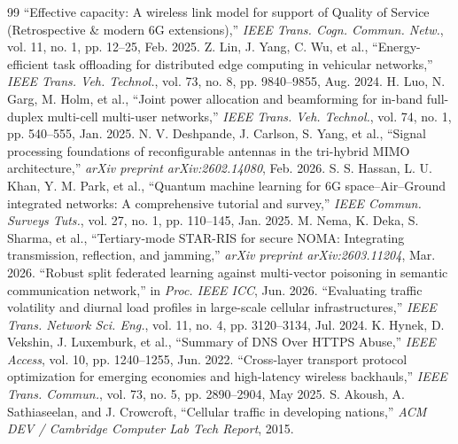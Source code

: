 \documentclass[journal]{IEEEtran}
\begin{document}
\begin{thebibliography}{99}
 ``Effective capacity: A wireless link model for support of Quality of Service (Retrospective \& modern 6G extensions),'' \emph{IEEE Trans. Cogn. Commun. Netw.}, vol. 11, no. 1, pp. 12--25, Feb. 2025.
 Z. Lin, J. Yang, C. Wu, et al., ``Energy-efficient task offloading for distributed edge computing in vehicular networks,'' \emph{IEEE Trans. Veh. Technol.}, vol. 73, no. 8, pp. 9840--9855, Aug. 2024.
 H. Luo, N. Garg, M. Holm, et al., ``Joint power allocation and beamforming for in-band full-duplex multi-cell multi-user networks,'' \emph{IEEE Trans. Veh. Technol.}, vol. 74, no. 1, pp. 540--555, Jan. 2025.
 N. V. Deshpande, J. Carlson, S. Yang, et al., ``Signal processing foundations of reconfigurable antennas in the tri-hybrid MIMO architecture,'' \emph{arXiv preprint arXiv:2602.14080}, Feb. 2026.
 S. S. Hassan, L. U. Khan, Y. M. Park, et al., ``Quantum machine learning for 6G space–Air–Ground integrated networks: A comprehensive tutorial and survey,'' \emph{IEEE Commun. Surveys Tuts.}, vol. 27, no. 1, pp. 110--145, Jan. 2025.
 M. Nema, K. Deka, S. Sharma, et al., ``Tertiary-mode STAR-RIS for secure NOMA: Integrating transmission, reflection, and jamming,'' \emph{arXiv preprint arXiv:2603.11204}, Mar. 2026.
 ``Robust split federated learning against multi-vector poisoning in semantic communication network,'' in \emph{Proc. IEEE ICC}, Jun. 2026.
 ``Evaluating traffic volatility and diurnal load profiles in large-scale cellular infrastructures,'' \emph{IEEE Trans. Network Sci. Eng.}, vol. 11, no. 4, pp. 3120--3134, Jul. 2024.
 K. Hynek, D. Vekshin, J. Luxemburk, et al., ``Summary of DNS Over HTTPS Abuse,'' \emph{IEEE Access}, vol. 10, pp. 1240--1255, Jun. 2022.
 ``Cross-layer transport protocol optimization for emerging economies and high-latency wireless backhauls,'' \emph{IEEE Trans. Commun.}, vol. 73, no. 5, pp. 2890--2904, May 2025.
 S. Akoush, A. Sathiaseelan, and J. Crowcroft, ``Cellular traffic in developing nations,'' \emph{ACM DEV / Cambridge Computer Lab Tech Report}, 2015.


\end{thebibliography}
\end{document}
